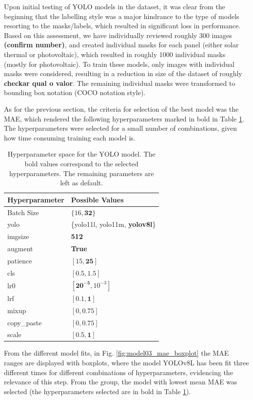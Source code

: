 \documentclass[conference]{IEEEtran}
\begin{document}
Upon initial testing of YOLO models in the dataset, it was clear from the beginning that the labelling style was a major hindrance to the type of models resorting to the masks/labels, which resulted in significant loss in performance. Based on this assessment, we have individually reviewed roughly 300 images \textbf{(confirm number)}, and created individual masks for each panel (either solar thermal or photovoltaic), which resulted in roughly 1000 individual masks (mostly for photovoltaic). To train these models, only images with individual masks were considered, resulting in a reduction in size of the dataset of roughly \textbf{checkar qual o valor}. The remaining individual masks were transformed to bounding box notation (COCO notation style).

As for the previous section, the criteria for selection of the best model was the MAE, which rendered the following hyperparameters marked in bold in Table \ref{parametrosobjid}. The hyperparameters were selected for a small number of combinations, given how time consuming training each model is.

\begin{table}[H]
\centering
\caption{Hyperparameter space for the YOLO model. The bold values correspond to the selected hyperparameters. The remaining parameters are left as default.}
\label{parametrosobjid}
\begin{tabular}{ll}
\toprule
\textbf{Hyperparameter} & \textbf{Possible Values} \\
\midrule
Batch Size & $\{16, \mathbf{32}\}$ \\
yolo & \{yolo11l, yolo11m, \textbf{yolov8l}\} \\
imgsize & \textbf{512} \\
augment & \textbf{True} \\
patience & $[15, \mathbf{25}]$ \\
cls & $[0.5, \mathbf{1.5}]$ \\
lr0 & $[\mathbf{20^{-5}}, 10^{-3}]$ \\
lrf & $[0.1, \mathbf{1}]$ \\
mixup & $[0, \mathbf{0.75}]$ \\
copy\_paste & $[0, \mathbf{0.75}]$ \\
scale & $[0.5, \mathbf{1}]$ \\
\bottomrule
\end{tabular}
\end{table}

From the different model fits, in Fig. \ref{fig:model03_mae_boxplot} the MAE ranges are displayed with boxplots, where the model YOLOv8L has been fit three different times for different combinations of hyperparameters, evidencing the relevance of this step. From the group, the model with lowest mean MAE was selected (the hyperparameters selected are in bold in Table \ref{parametrosobjid}).
\end{document}

